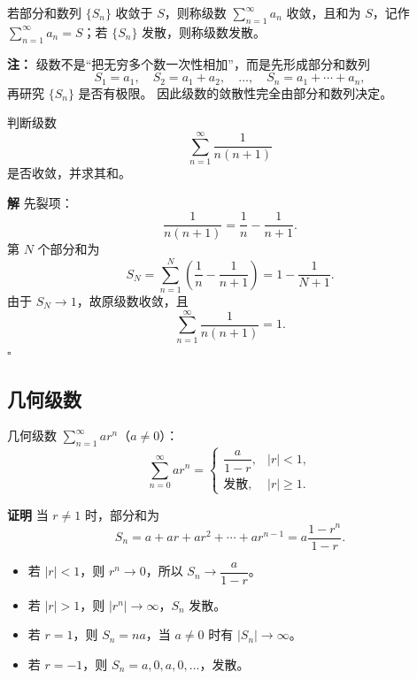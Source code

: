 \documentclass[fontset=fandol]{ctexart}
\newenvironment{custom}[1]{\par\noindent\textbf{#1}\quad}{\par\vspace{0.8em}}
\newenvironment{solution}{\par\noindent\textbf{解}\quad}{\hfill$\square$\par\vspace{0.8em}}
\begin{document}
\begin{definition}[级数收敛与发散]
若部分和数列 \(\{S_n\}\) 收敛于 \(S\)，则称级数 \(\sum\limits_{n = 1}^{  \infty } a_n\) 收敛，且和为 \(S\)，记作 \(\sum\limits_{n = 1}^{  \infty } a_n = S\)；若 \(\{S_n\}\) 发散，则称级数发散。
\end{definition}

\begin{custom}{注：}
级数不是“把无穷多个数一次性相加”，而是先形成部分和数列
\[
S_1=a_1,\quad S_2=a_1+a_2,\quad \ldots,\quad S_n=a_1+\cdots+a_n,
\]
再研究 $\{S_n\}$ 是否有极限。 因此级数的敛散性完全由部分和数列决定。
\end{custom}

\begin{example}
判断级数
\[
\sum_{n=1}^{\infty}\frac{1}{n(n+1)}
\]
是否收敛，并求其和。
\end{example}
\begin{solution}
先裂项：
\[
\frac{1}{n(n+1)}=\frac1n-\frac{1}{n+1}.
\]
第 $N$ 个部分和为
\[
S_N=\sum_{n=1}^{N}\left(\frac1n-\frac{1}{n+1}\right)
=1-\frac{1}{N+1}.
\]
由于 $S_N\to1$，故原级数收敛，且
\[
\sum_{n=1}^{\infty}\frac{1}{n(n+1)}=1.
\]
\end{solution}

\subsection*{几何级数}

\begin{example}[几何级数]
几何级数 \(\sum\limits_{n = 1}^{  \infty } ar^n\)（\(a \neq 0\)）：
\[
\sum_{n=0}^{\infty} ar^n = 
\begin{cases}
\dfrac{a}{1-r}, & |r| < 1,\\[6pt]
\text{发散}, & |r| \geq 1.
\end{cases}
\]
\end{example}

\begin{custom}{证明}
当 \(r \neq 1\) 时，部分和为
\[
S_n = a + ar + ar^2 + \cdots + ar^{n-1} = a\dfrac{1-r^n}{1-r}.
\]
\begin{itemize}
\item 若 \(|r| < 1\)，则 \(r^n \to 0\)，所以 \(S_n \to \dfrac{a}{1-r}\)。
\item 若 \(|r| > 1\)，则 \(|r^n| \to \infty\)，\(S_n\) 发散。
\item 若 \(r=1\)，则 \(S_n=na\)，当 \(a\neq0\) 时有 \(|S_n|\to\infty\)。
\item 若 \(r = -1\)，则 \(S_n = a, 0, a, 0, \dots\)，发散。
\end{itemize}
\end{custom}
\end{document}
